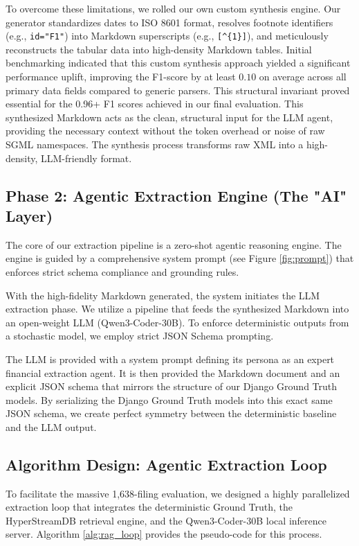 \documentclass[journal, onecolumn]{IEEEtran}
\begin{document}
To overcome these limitations, we rolled our own custom synthesis engine. Our generator standardizes dates to ISO 8601 format, resolves footnote identifiers (e.g., \texttt{id="F1"}) into Markdown superscripts (e.g., \texttt{[\textasciicircum\{1\}]}), and meticulously reconstructs the tabular data into high-density Markdown tables. Initial benchmarking indicated that this custom synthesis approach yielded a significant performance uplift, improving the F1-score by at least $0.10$ on average across all primary data fields compared to generic parsers. This structural invariant proved essential for the 0.96+ F1 scores achieved in our final evaluation. This synthesized Markdown acts as the clean, structural input for the LLM agent, providing the necessary context without the token overhead or noise of raw SGML namespaces. The synthesis process transforms raw XML into a high-density, LLM-friendly format.

\subsection{Phase 2: Agentic Extraction Engine (The "AI" Layer)}
The core of our extraction pipeline is a zero-shot agentic reasoning engine. The engine is guided by a comprehensive system prompt (see Figure \ref{fig:prompt}) that enforces strict schema compliance and grounding rules.

With the high-fidelity Markdown generated, the system initiates the LLM extraction phase. We utilize a pipeline that feeds the synthesized Markdown into an open-weight LLM (Qwen3-Coder-30B). To enforce deterministic outputs from a stochastic model, we employ strict JSON Schema prompting.

The LLM is provided with a system prompt defining its persona as an expert financial extraction agent. It is then provided the Markdown document and an explicit JSON schema that mirrors the structure of our Django Ground Truth models. By serializing the Django Ground Truth models into this exact same JSON schema, we create perfect symmetry between the deterministic baseline and the LLM output.

\subsection{Algorithm Design: Agentic Extraction Loop}
To facilitate the massive 1,638-filing evaluation, we designed a highly parallelized extraction loop that integrates the deterministic Ground Truth, the HyperStreamDB retrieval engine, and the Qwen3-Coder-30B local inference server. Algorithm \ref{alg:rag_loop} provides the pseudo-code for this process.
\end{document}
